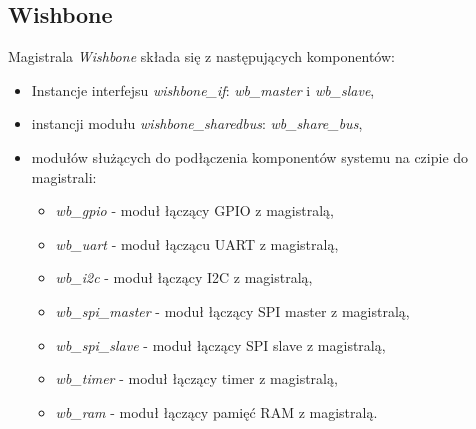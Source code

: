 \documentclass[11pt,a4paper]{article}
\begin{document}
	\subsection{Wishbone}
	\hspace{5mm}
Magistrala \textit{Wishbone} składa się z następujących komponentów:
\begin{itemize}
\item Instancje interfejsu \textit{wishbone\_if}: \textit{wb\_master} i \textit{wb\_slave},
\item instancji modułu \textit{wishbone\_sharedbus}: \textit{wb\_share\_bus},
\item modułów służących do podłączenia komponentów systemu na czipie do magistrali:
	\begin{itemize}
		\item \textit{wb\_gpio} - moduł łączący GPIO z magistralą,
		\item \textit{wb\_uart} - moduł łączącu UART z magistralą,
		\item \textit{wb\_i2c} - moduł łączący I2C z magistralą,
		\item \textit{wb\_spi\_master} - moduł łączący SPI master z magistralą,
		\item \textit{wb\_spi\_slave} - moduł łączący SPI slave z magistralą,
		\item \textit{wb\_timer} - moduł łączący timer z magistralą,
		\item \textit{wb\_ram} - moduł łączący pamięć RAM z magistralą.
	\end{itemize}
\end{itemize}
\end{document}
